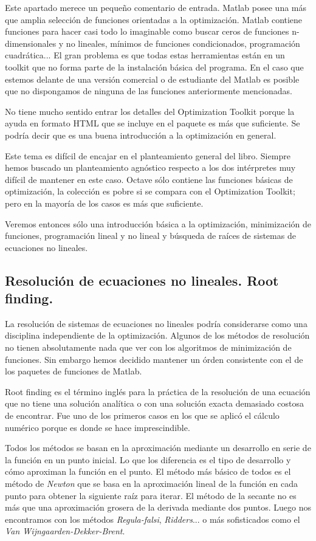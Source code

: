 Este apartado merece un pequeño comentario de entrada. Matlab posee
una más que amplia selección de funciones orientadas a la
optimización.  Matlab contiene funciones para hacer casi todo lo
imaginable como buscar ceros de funciones n-dimensionales y no
lineales, mínimos de funciones condicionados, programación
cuadrática... El gran problema es que todas estas herramientas están
en un toolkit que no forma parte de la instalación básica del
programa. En el caso que estemos delante de una versión comercial o de
estudiante del Matlab es posible que no dispongamos de ninguna de las
funciones anteriormente mencionadas.

No tiene mucho sentido entrar los detalles del Optimization Toolkit
porque la ayuda en formato HTML que se incluye en el paquete es más
que suficiente. Se podría decir que es una buena introducción a la
optimización en general.

Este tema es difícil de encajar en el planteamiento general del libro.
Siempre hemos buscado un planteamiento agnóstico respecto a los dos
intérpretes muy difícil de mantener en este caso. Octave sólo contiene
las funciones básicas de optimización, la colección es pobre si se
compara con el Optimization Toolkit; pero en la mayoría de los casos
es más que suficiente.

Veremos entonces sólo una introducción básica a la optimización,
minimización de funciones, programación lineal y no lineal y búsqueda
de raíces de sistemas de ecuaciones no lineales.


\subsection{Resolución de ecuaciones no lineales. Root finding.}

La resolución de sistemas de ecuaciones no lineales podría
considerarse como una disciplina independiente de la optimización.
Algunos de los métodos de resolución no tienen absolutamente nada que
ver con los algoritmos de minimización de funciones. Sin embargo hemos
decidido mantener un órden consistente con el de los paquetes de
funciones de Matlab.

Root finding es el término inglés para la práctica de la resolución de
una ecuación que no tiene una solución analítica o con una solución
exacta demasiado costosa de encontrar. Fue uno de los primeros casos
en los que se aplicó el cálculo numérico porque es donde se hace
imprescindible.

Todos los métodos se basan en la aproximación mediante un desarrollo
en serie de la función en un punto inicial. Lo que los diferencia es
el tipo de desarrollo y cómo aproximan la función en el punto.  El
método más básico de todos es el método de \emph{Newton} que se basa
en la aproximación lineal de la función en cada punto para obtener la
siguiente raíz para iterar. El método de la secante no es más que una
aproximación grosera de la derivada mediante dos puntos. Luego nos
encontramos con los métodos \emph{Regula-falsi}, \emph{Ridders}...  o
más sofisticados como el \emph{Van Wijngaarden-Dekker-Brent}.

